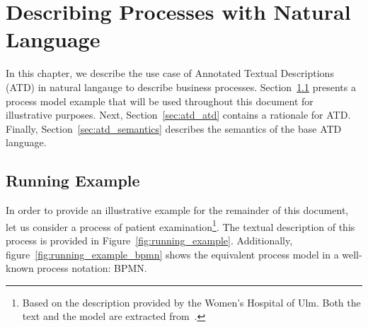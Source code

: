 \chapter{Describing Processes with Natural Language}
\label{cha:atd}

In this chapter, we describe the use case of Annotated Textual
Descriptions (ATD) in natural langauge to describe business processes.
Section~\ref{sec:atd_running_example} presents a process model example that will be
used throughout this document for illustrative purposes. Next,
Section~\ref{sec:atd_atd} contains a rationale for ATD. Finally,
Section~\ref{sec:atd_semantics} describes the semantics of the base ATD language.

\section{Running Example}
\label{sec:atd_running_example}

In order to provide an illustrative example for the remainder of this document,
let us consider a process of patient examination\footnote{Based on the
  description provided by the Women's Hospital of Ulm. Both the text and the
  model are extracted from~\cite{CabanillasKRRMC15}.}.  The textual description
of this process is provided in Figure~\ref{fig:running_example}. Additionally,
figure~\ref{fig:running_example_bpmn} shows the equivalent process model in a
well-known process notation: BPMN.

